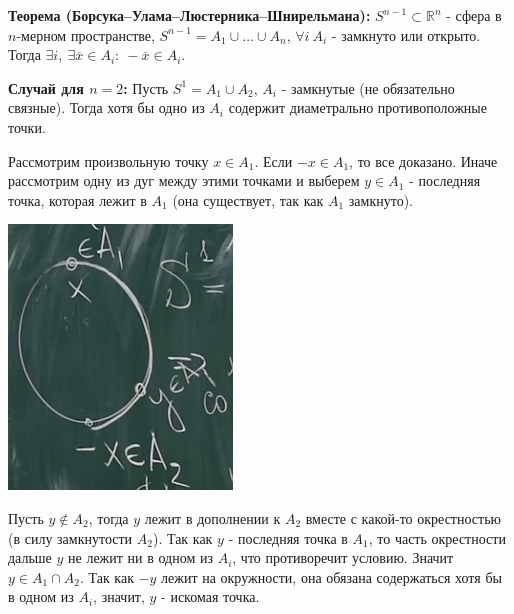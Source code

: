 \par \textbf{Теорема (Борсука–Улама–Люстерника–Шнирельмана):} $S^{n-1} \subset \mathbb{R}^n$ - сфера в $n$-мерном пространстве, $S^{n-1}=A_1 \cup \ldots \cup A_n$, $\forall i \: A_i$ - замкнуто или открыто. Тогда $\exists i, \: \exists \overline{x} \in A_i: \: -\overline{x} \in A_i$.

\par \textbf{Случай для $n=2$:} Пусть $S^1=A_1 \cup A_2$, $A_i$ - замкнутые (не обязательно связные). Тогда хотя бы одно из $A_i$ содержит диаметрально противоположные точки.
\par \Proof Рассмотрим произвольную точку $x \in A_1$. Если $-x \in A_1$, то все доказано. Иначе рассмотрим одну из дуг между этими точками и выберем $y \in A_1$ - последняя точка, которая лежит в $A_1$ (она существует, так как $A_1$ замкнуто). 
\begin{center}
    \includegraphics[scale=0.5]{images/dima_s1.png}
\end{center}

\par Пусть $y \not\in A_2$, тогда $y$ лежит в дополнении к $A_2$ вместе с какой-то окрестностью (в силу замкнутости $A_2$). Так как $y$ - последняя точка в $A_1$, то часть окрестности дальше $y$ не лежит ни в одном из $A_i$, что противоречит условию. Значит $y \in A_1 \cap A_2$. Так как $-y$ лежит на окружности, она обязана содержаться хотя бы в одном из $A_i$, значит, $y$ - искомая точка. \EndProof

